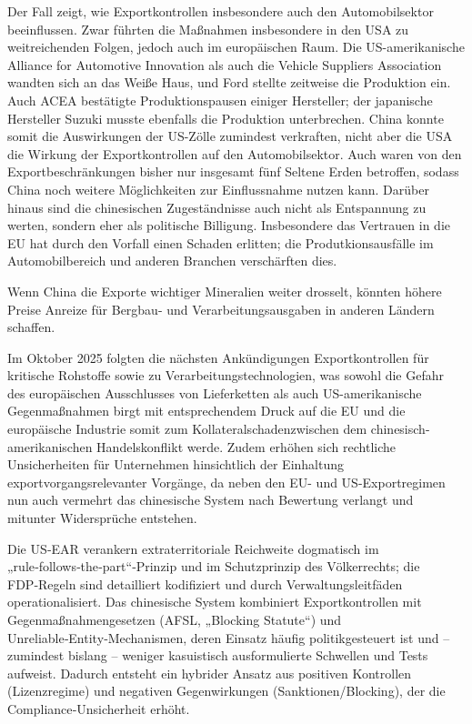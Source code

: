 \documentclass[12pt,a4paper,oneside]{book} %
\begin{document}
Der Fall zeigt, wie Exportkontrollen insbesondere auch den Automobilsektor beeinflussen. Zwar führten die  Maßnahmen insbesondere in den USA zu weitreichenden Folgen, jedoch auch im europäischen Raum. Die US-amerikanische Alliance for Automotive Innovation als auch die Vehicle Suppliers Association wandten sich an das Weiße Haus, und Ford stellte zeitweise die Produktion ein. Auch ACEA bestätigte Produktionspausen einiger Hersteller; der japanische Hersteller Suzuki musste ebenfalls die Produktion unterbrechen. China konnte somit die Auswirkungen der US-Zölle zumindest verkraften, nicht aber die USA die Wirkung der Exportkontrollen auf den Automobilsektor. Auch waren von den Exportbeschränkungen bisher nur insgesamt fünf Seltene Erden betroffen, sodass China noch weitere Möglichkeiten zur Einflussnahme nutzen kann. Darüber hinaus sind die chinesischen Zugeständnisse auch nicht als Entspannung zu werten, sondern eher als politische Billigung.
Insbesondere das Vertrauen in die EU hat durch den Vorfall einen Schaden erlitten; die Produtkionsausfälle im Automobilbereich und anderen Branchen verschärften dies.

Wenn China die Exporte wichtiger Mineralien weiter drosselt, könnten höhere Preise Anreize für Bergbau- und Verarbeitungsausgaben in anderen Ländern schaffen.

Im Oktober 2025 folgten die nächsten Ankündigungen Exportkontrollen für kritische Rohstoffe sowie zu Verarbeitungstechnologien,\autocite{https://www.jonesday.com/en/insights/2025/10/china-imposes-extraterritorial-export-control-measures-over-rare-earth-items} was sowohl die Gefahr des europäischen Ausschlusses von Lieferketten als auch US-amerikanische Gegenmaßnahmen birgt mit entsprechendem Druck auf die EU und die europäische Industrie somit zum \glqq Kollateralschaden\grqq zwischen dem chinesisch-amerikanischen Handelskonflikt werde.\autocite{Handelsblatt Vela} Zudem erhöhen sich rechtliche Unsicherheiten für Unternehmen hinsichtlich der Einhaltung exportvorgangsrelevanter Vorgänge, da neben den EU- und US-Exportregimen nun auch vermehrt das chinesische System nach Bewertung verlangt und mitunter Widersprüche entstehen.\autocite[siehe hierzu ausführlich]{Neckel: Exportkontrolle im geopolitischen Wettstreit(EuZW 2025, 710, 715)}

Die US‑EAR verankern extraterritoriale Reichweite dogmatisch im „rule‑follows‑the‑part“‑Prinzip und im Schutzprinzip des Völkerrechts; die FDP‑Regeln sind detailliert kodifiziert und durch Verwaltungsleitfäden operationalisiert.  Das chinesische System kombiniert Exportkontrollen mit Gegenmaßnahmengesetzen (AFSL, „Blocking Statute“) und Unreliable‑Entity‑Mechanismen, deren Einsatz häufig politikgesteuert ist und – zumindest bislang – weniger kasuistisch ausformulierte Schwellen und Tests aufweist.  Dadurch entsteht ein hybrider Ansatz aus positiven Kontrollen (Lizenzregime) und negativen Gegenwirkungen (Sanktionen/Blocking), der die Compliance‑Unsicherheit erhöht.
\end{document}
